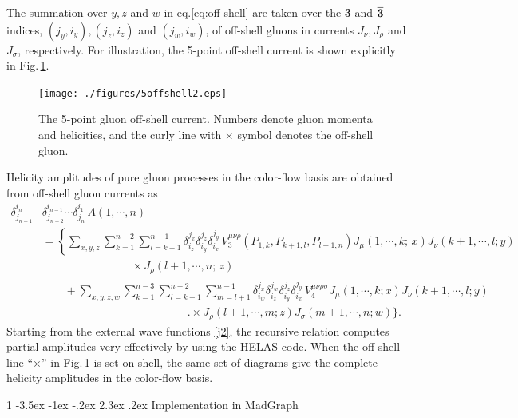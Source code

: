 \documentclass[a4paper,11pt]{article}
\makeatletter
\renewcommand{\section}{%
  \@startsection{section}%
   {1}%
   {\z@}%
   {-3.5ex \@plus -1ex \@minus -.2ex}%
   {2.3ex \@plus.2ex}%
   {\normalfont\large\bfseries}%
}%
\makeatother
\begin{document}
The summation over $y,z$ and $w$ in eq.\eqref{eq:off-shell} are taken over the {\bf 3} and $\overline{{\bf 3}}$ indices, $(j_y, i_y), (j_z, i_z)$
 and $(j_w, i_w)$, of off-shell gluons in currents $J_{\nu}, J_{\rho}$ and $J_{\sigma}$, respectively.
 For
illustration, the 5-point off-shell current is shown explicitly in
Fig.\,\ref{fig:5offshell}.
\begin{figure}
\begin{center}
\texttt{[image: ./figures/5offshell2.eps]}
\caption{The 5-point gluon off-shell current. Numbers denote gluon momenta
 and helicities, and the curly line with $\times$ symbol denotes the off-shell
 gluon.}
\label{fig:5offshell}
\end{center}
\end{figure}

Helicity amplitudes of pure gluon processes in the color-flow basis are obtained from off-shell
gluon currents as
\begin{align}
\delta_{j_{n-1}}^{i_n}&\delta_{j_{n-2}}^{i_{n-1}}\cdots\delta_{j_n}^{i_1}\,A(1,\cdots,n)\nonumber\\
&=\left\{\sum_{x,y,z}\sum_{k=1}^{n-2}\sum_{l=k+1}^{n-1}
\delta_{i_z}^{j_x}\delta_{i_y}^{j_z}\delta_{i_x}^{j_y}\,V^{\mu\nu\rho}_3(P_{1,k},
 P_{k+1,l},P_{l+1,n})J_{\mu}
(1,\cdots,k;\,x)J_{\nu}(k+1,\cdots,l; y)\right.\nonumber\\
&\hspace{8em}\times J_{\rho}(l+1,\cdots,n;\,z)\nonumber\\
&\hspace{2em}+\sum_{x,y,z,w}\sum_{k=1}^{n-3}\sum_{l=k+1}^{n-2}\sum_{m=l+1}^{n-1}
\delta_{i_w}^{j_x}\delta_{i_z}^{j_w}\delta_{i_y}^{j_z}\delta_{i_x}^{j_y}\,
V^{\mu\nu\rho\sigma}_4J_{\mu}(1,\cdots,k;x)J_{\nu}(k+1,\cdots,l;y)\nonumber\\
&\hspace{13em}\Biggl.\times J_{\rho}(l+1,\cdots,m;z)J_{\sigma}(m+1,\cdots,n;w)\Biggr\}.
\label{eq:amplitude}
\end{align}
Starting from the external wave functions \eqref{j2}, the recursive
relation computes partial amplitudes very effectively by using the
HELAS code. When the off-shell line ``$\times$'' in Fig.\,\ref{fig:5offshell} is set
on-shell, the same set of diagrams give the complete helicity amplitudes
in the color-flow basis.

\section{{\large Implementation in MadGraph}}
\label{implement}
\end{document}
